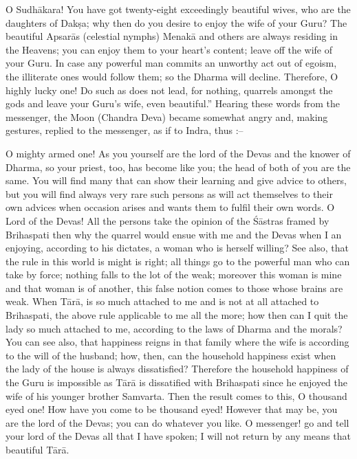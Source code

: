 O Sudh\=akara! You have got twenty-eight exceedingly beautiful wives, who are the daughters of Dak\d{s}a; why then do you desire to enjoy the wife of your Guru? The beautiful Apsar\=as (celestial nymphs) Menak\=a and others are always residing in the Heavens; you can enjoy them to your heart's content; leave off the wife of your Guru. In case any powerful man commits an unworthy act out of egoism, the illiterate ones would follow them; so the Dharma will decline. Therefore, O highly lucky one! Do such as does not lead, for nothing, quarrels amongst the gods and leave your Guru's wife, even beautiful.'' Hearing these words from the messenger, the Moon (Chandra Deva) became somewhat angry and, making gestures, replied to the messenger, as if to Indra, thus :--

O mighty armed one! As you yourself are the lord of the Devas and the knower of Dharma, so your priest, too, has become like you; the head of both of you are the same. You will find many that can show their learning and give advice to others, but you will find always very rare such persons as will act themselves to their own advices when occasion arises and wants them to fulfil their own words. O Lord of the Devas! All the persons take the opinion of the \'S\=astras framed by Brihaspati then why the quarrel would ensue with me and the Devas when I an enjoying, according to his dictates, a woman who is herself willing? See also, that the rule in this world is might is right; all things go to the powerful man who can take by force; nothing falls to the lot of the weak; moreover this woman is mine and that woman is of another, this false notion comes to those whose brains are weak. When T\=ar\=a, is so much attached to me and is not at all attached to Brihaspati, the above rule applicable to me all the more; how then can I quit the lady so much attached to me, according to the laws of Dharma and the morals? You can see also, that happiness reigns in that family where the wife is according to the will of the husband; how, then, can the household happiness exist when the lady of the house is always dissatisfied? Therefore the household happiness of the Guru is impossible as T\=ar\=a is dissatified with Brihaspati since he enjoyed the wife of his younger brother Samvarta. Then the result comes to this, O thousand eyed one! How have you come to be thousand eyed! However that may be, you are the lord of the Devas; you can do whatever you like. O messenger! go and tell your lord of the Devas all that I have spoken; I will not return by any means that beautiful T\=ar\=a.

